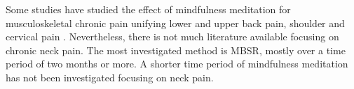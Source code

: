 Some studies have studied the effect of mindfulness meditation for musculoskeletal chronic pain unifying lower and upper back pain, shoulder and cervical pain \cite{Chiesa2010}. Nevertheless, there is not much literature available focusing on chronic neck pain. The most investigated method is MBSR, mostly over a time period of two months or more. A shorter time period of mindfulness meditation has not been investigated focusing on neck pain.

